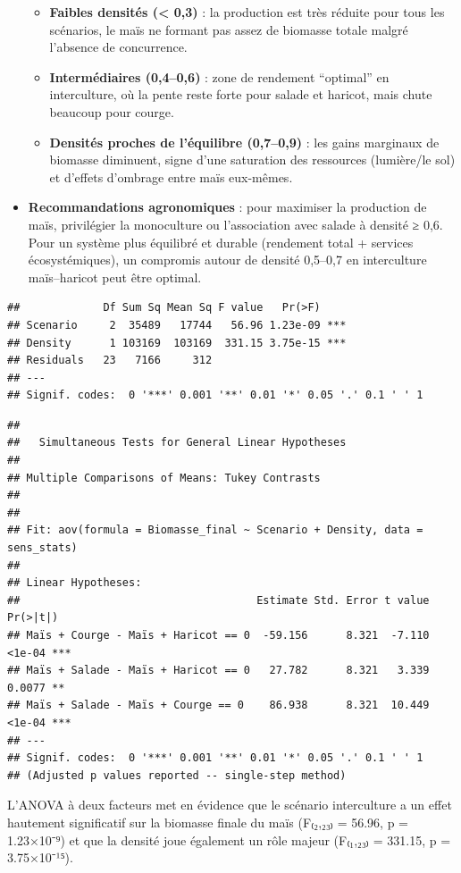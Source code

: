 \documentclass[
]{article}
\begin{document}
\begin{itemize}
  \begin{itemize}
  \item
    \textbf{Faibles densités (\textless{} 0,3)} : la production est très
    réduite pour tous les scénarios, le maïs ne formant pas assez de
    biomasse totale malgré l'absence de concurrence.
  \item
    \textbf{Intermédiaires (0,4--0,6)} : zone de rendement ``optimal''
    en interculture, où la pente reste forte pour salade et haricot,
    mais chute beaucoup pour courge.
  \item
    \textbf{Densités proches de l'équilibre (0,7--0,9)} : les gains
    marginaux de biomasse diminuent, signe d'une saturation des
    ressources (lumière/le sol) et d'effets d'ombrage entre maïs
    eux-mêmes.
  \end{itemize}
\item
  \textbf{Recommandations agronomiques} : pour maximiser la production
  de maïs, privilégier la monoculture ou l'association avec salade à
  densité ≥ 0,6. Pour un système plus équilibré et durable (rendement
  total + services écosystémiques), un compromis autour de densité
  0,5--0,7 en interculture maïs--haricot peut être optimal.
\end{itemize}

\begin{verbatim}
##             Df Sum Sq Mean Sq F value   Pr(>F)    
## Scenario     2  35489   17744   56.96 1.23e-09 ***
## Density      1 103169  103169  331.15 3.75e-15 ***
## Residuals   23   7166     312                     
## ---
## Signif. codes:  0 '***' 0.001 '**' 0.01 '*' 0.05 '.' 0.1 ' ' 1
\end{verbatim}

\begin{verbatim}
## 
##   Simultaneous Tests for General Linear Hypotheses
## 
## Multiple Comparisons of Means: Tukey Contrasts
## 
## 
## Fit: aov(formula = Biomasse_final ~ Scenario + Density, data = sens_stats)
## 
## Linear Hypotheses:
##                                     Estimate Std. Error t value Pr(>|t|)    
## Maïs + Courge - Maïs + Haricot == 0  -59.156      8.321  -7.110   <1e-04 ***
## Maïs + Salade - Maïs + Haricot == 0   27.782      8.321   3.339   0.0077 ** 
## Maïs + Salade - Maïs + Courge == 0    86.938      8.321  10.449   <1e-04 ***
## ---
## Signif. codes:  0 '***' 0.001 '**' 0.01 '*' 0.05 '.' 0.1 ' ' 1
## (Adjusted p values reported -- single-step method)
\end{verbatim}

L'ANOVA à deux facteurs met en évidence que le scénario interculture a
un effet hautement significatif sur la biomasse finale du maïs (F₍₂,₂₃₎
= 56.96, p = 1.23×10⁻⁹) et que la densité joue également un rôle majeur
(F₍₁,₂₃₎ = 331.15, p = 3.75×10⁻¹⁵).
\end{document}
